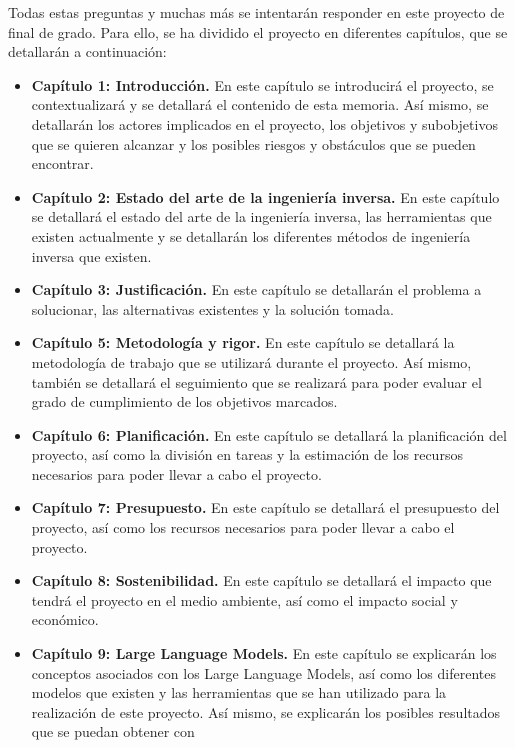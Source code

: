 Todas estas preguntas y muchas más se intentarán responder en este proyecto de final
de grado. Para ello, se ha dividido el proyecto en diferentes capítulos, que se
detallarán a continuación:

\begin{itemize}
    \item \textbf{Capítulo 1: Introducción.} En este capítulo se introducirá el proyecto,
        se contextualizará y se detallará el contenido de esta memoria. Así mismo, se
        detallarán los actores implicados en el proyecto, los objetivos y subobjetivos
        que se quieren alcanzar y los posibles riesgos y obstáculos que se pueden encontrar.
    \item \textbf{Capítulo 2: Estado del arte de la ingeniería inversa.} En este capítulo
        se detallará el estado del arte de la ingeniería inversa, las herramientas que
        existen actualmente y se detallarán los diferentes métodos de ingeniería inversa 
        que existen.
    \item \textbf{Capítulo 3: Justificación.} En este capítulo se detallarán el problema
        a solucionar, las alternativas existentes y la solución tomada.
    \item \textbf{Capítulo 5: Metodología y rigor.} En este capítulo se detallará la
        metodología de trabajo que se utilizará durante el proyecto. Así mismo, también
        se detallará el seguimiento que se realizará para poder evaluar el grado de
        cumplimiento de los objetivos marcados.
    \item \textbf{Capítulo 6: Planificación.} En este capítulo se detallará la planificación
        del proyecto, así como la división en tareas y la estimación de los recursos
        necesarios para poder llevar a cabo el proyecto.
    \item \textbf{Capítulo 7: Presupuesto.} En este capítulo se detallará el presupuesto
        del proyecto, así como los recursos necesarios para poder llevar a cabo el proyecto.
    \item \textbf{Capítulo 8: Sostenibilidad.} En este capítulo se detallará el impacto
        que tendrá el proyecto en el medio ambiente, así como el impacto social y económico.
    \item \textbf{Capítulo 9: Large Language Models.} En este capítulo se explicarán los
        conceptos asociados con los Large Language Models, así como los diferentes modelos
        que existen y las herramientas que se han utilizado para la realización de este
        proyecto. Así mismo, se explicarán los posibles resultados que se puedan obtener con

\end{itemize}
